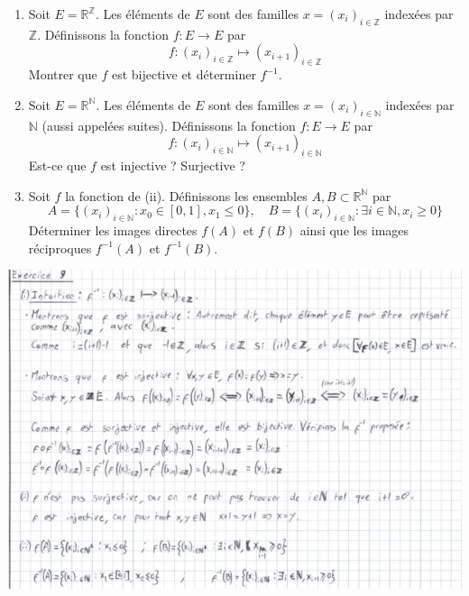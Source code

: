 \documentclass[a4paper, 10pt]{report}
\begin{document}
	\begin{enumerate}[label=(\roman*)]
		\item Soit $E = \mathbb{R}^{\mathbb{Z}}$. Les éléments de $E$
		sont des familles $x = (x_i)_{i \in \mathbb{Z}}$ indexées par
		$\mathbb{Z}$. Définissons la fonction $f : E \to E$ par
		\[
		f : (x_i)_{i \in \mathbb{Z}} \mapsto (x_{i+1})_{i \in \mathbb{Z}}
		\]
		Montrer que $f$ est bijective et déterminer $f^{-1}$.
		\item Soit $E = \mathbb{R}^{\mathbb{N}}$. Les éléments de $E$
		sont des familles $x = (x_i)_{i \in \mathbb{N}}$ indexées par
		$\mathbb{N}$ (aussi appelées suites).
		Définissons la fonction $f : E \to E$ par
		\[
		f : (x_i)_{i \in \mathbb{N}} \mapsto (x_{i+1})_{i \in \mathbb{N}}
		\]
		Est-ce que $f$ est injective ? Surjective ?
		\item Soit $f$ la fonction de (ii). Définissons les ensembles
		$A, B \subset \mathbb{R}^{\mathbb{N}}$ par
		\[
		A = \{(x_i)_{i \in \mathbb{N}} : x_0 \in [0,1], x_1 \leq 0\},
		\quad
		B = \{(x_i)_{i \in \mathbb{N}} : \exists i \in \mathbb{N}, x_i \geq 0\}
		\]
		Déterminer les images directes $f(A)$ et $f(B)$ ainsi que les
		images réciproques $f^{-1}(A)$ et $f^{-1}(B)$.
	\end{enumerate}
		
	\includegraphics{ex09.jpg}
		
\end{document}
